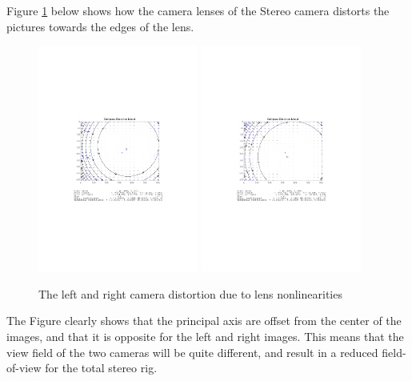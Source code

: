Figure \ref{chap3:fig-comp-lensdist} below shows how the camera lenses of the Stereo camera distorts the pictures
towards the edges of the lens. 
\begin{figure}[htbp]
    \centering
    \includegraphics[width=0.47\textwidth]{pics/left_comp_dist}
    \includegraphics[width=0.47\textwidth]{pics/right_comp_dist}
    \caption{The left and right camera distortion due to lens nonlinearities}
    \label{chap3:fig-comp-lensdist}
\end{figure}
The Figure clearly shows that the principal axis are offset from the center of the images,
and that it is opposite for the left and right images. This means that the view field of
the two cameras will be quite different, and result in a reduced field-of-view for the
total stereo rig.

